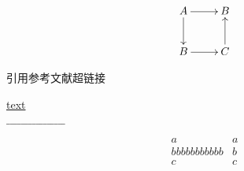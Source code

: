\documentclass[UTF8, a4paper, 12pt, oneside, onecolumn]{article}
\begin{document}
\begin{equation}\label{cdd}
\xymatrix{
A \ar[d] \ar[r] & B \\
B \ar[r] & C \ar[u]}
\end{equation}

\pageref{LastPage}

引用参考文献超链接

\hyperref[cdd]{text}

$\_\_\_\_\_\_\_\_\_\_\_\_\_\_\_\_$

\begin{equation*}
\begin{split}
    a \\
     bbbbbbbbbbb \\
      c
  \end{split}
  \begin{array}{c}
    a \\
    b \\
    c
  \end{array}
\end{equation*}
\end{document}
